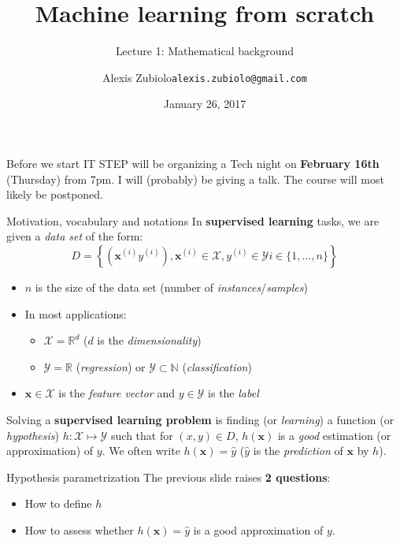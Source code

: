 \documentclass{beamer}
\title[Course presentation]{Machine learning from scratch}
\subtitle{Lecture 1: Mathematical background}
\author{Alexis Zubiolo\newline\texttt{alexis.zubiolo@gmail.com}}
\institute{Data Science Team Lead @ Adcash}
\date{January 26, 2017}
\newcommand{\X}{\mathcal{X}}
\newcommand{\Y}{\mathcal{Y}}
\newcommand{\real}{\mathbb{R}}
\newcommand{\N}{\mathbb{N}}
\newcommand{\yhat}{\hat{y}}
\newcommand{\bxi}{\bm{x}^{(i)}}
\newcommand{\bx}{\bm{x}}
\newcommand{\yi}{y^{(i)}}
\begin{document}
\begin{frame}
  \titlepage
\end{frame}

\begin{frame}{Before we start}
IT STEP will be organizing a Tech night on \textbf{February 16th} (Thursday) from 7pm. I will (probably) be giving a talk. The course will most likely be postponed.
\end{frame}

\begin{frame}{Motivation, vocabulary and notations}
In \textbf{supervised learning} tasks, we are given a \textit{data set} of the form:
$$ D = \left\{ (\bxi \yi), \bxi \in \X, \yi \in \Y i \in \{1, \dots, n \}  \right\}$$
\pause
\begin{itemize}
	\item $n$ is the size of the data set (number of \textit{instances}/\textit{samples})
	\item In most applications:
	\begin{itemize}
		\item $\X = \real^d$ ($d$ is the \textit{dimensionality})
		\item $\Y = \real$ (\textit{regression}) or $\Y \subset \N$ (\textit{classification})
	\end{itemize}		
	\item $\bx \in \X$ is the \textit{feature vector} and $y \in \Y$ is the \textit{label}
\end{itemize}
\pause
\vfill
Solving a \textbf{supervised learning problem} is finding (or \textit{learning}) a function (or \textit{hypothesis}) $h : \X \mapsto \Y$ such that for $(x, y)\in D$, $h(\bx)$ is a \textit{good} estimation  (or approximation) of $y$.
\pause
\vfill
We often write $h(\bx) = \yhat$ ($\yhat$ is the \textit{prediction} of $\bx$ by $h$).
\end{frame}

\begin{frame}{Hypothesis parametrization}
The previous slide raises \textbf{2 questions}:
\begin{itemize}
	\item How to define $h$
	\item How to assess whether $h(\bx) = \yhat$ is a good approximation of $y$.
\end{itemize}
\end{frame}
\end{document}
